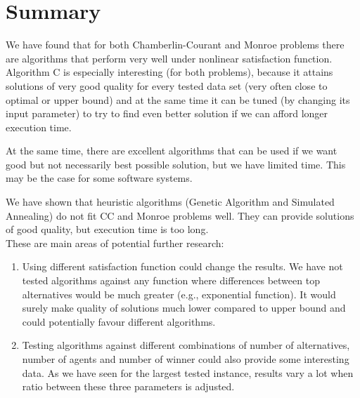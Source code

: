 \chapter{Summary}
\label{cha:testy}

We have found that for both Chamberlin-Courant and Monroe problems there are algorithms that perform very well under nonlinear satisfaction function. Algorithm C is especially interesting (for both problems), because it attains solutions of very good quality for every tested data set (very often close to optimal or upper bound) and at the same time it can be tuned (by changing its input parameter) to try to find even better solution if we can afford longer execution time.

At the same time, there are excellent algorithms that can be used if we want good but not necessarily best possible solution, but we have limited time. This may be the case for some software systems.

We have shown that heuristic algorithms (Genetic Algorithm and Simulated Annealing) do not fit CC and Monroe problems well. They can provide solutions of good quality, but execution time is too long.
\\

These are main areas of potential further research:
\begin{enumerate}
	\item Using different satisfaction function could change the results. We have not tested algorithms against any function where differences between top alternatives would be much greater (e.g., exponential function). It would surely make quality of solutions much lower compared to upper bound and could potentially favour different algorithms.
	\item Testing algorithms against different combinations of number of alternatives, number of agents and number of winner could also provide some interesting data. As we have seen for the largest tested instance, results vary a lot when ratio between these three parameters is adjusted.
\end{enumerate}